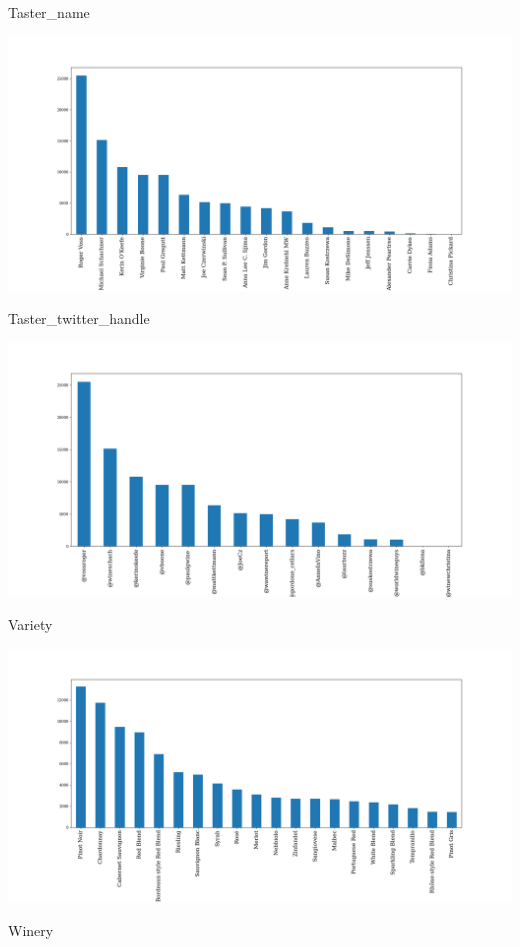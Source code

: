\documentclass[11pt]{article}
\begin{document}
Taster\_name

\includegraphics[width=\textwidth,height=\textheight,keepaspectratio]{figures/1c_histogram_of_taster_name.png}

Taster\_twitter\_handle

\includegraphics[width=\textwidth,height=\textheight,keepaspectratio]{figures/1c_histogram_of_taster_twitter_handle.png}

Variety

\includegraphics[width=\textwidth,height=\textheight,keepaspectratio]{figures/1c_histogram_of_variety.png}

Winery
\end{document}
